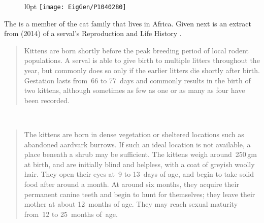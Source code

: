 \begin{figure}l{0pt}
\texttt{[image: EigGen/P1040280]}
\end{figure}
\begin{example} \label{eg:serval} 
The  is a member of the cat family that lives in Africa.
Given next is an extract from  (2014) of a serval's Reproduction and Life History \cite[pp.~142--151]{Sunquist2002}.

\begin{quote}
Kittens are born shortly before the peak breeding period of local rodent populations. A serval is able to give birth to multiple litters throughout the year, but commonly does so only if the earlier litters die shortly after birth. Gestation lasts from~66 to 77~days and commonly results in the birth of two kittens, although sometimes as few as one or as many as four have been recorded.

\end{quote}\ \vspace{-1.5\baselineskip}\begin{quote}%
The kittens are born in dense vegetation or sheltered locations such as abandoned aardvark burrows. If such an ideal location is not available, a place beneath a shrub may be sufficient. The kittens weigh around~250\,gm at birth, and are initially blind and helpless, with a coat of greyish woolly hair. They open their eyes at~9 to 13~days of age, and begin to take solid food after around a month. At around six months, they acquire their permanent canine teeth and begin to hunt for themselves; they leave their mother at about 12~months of age. They may reach sexual maturity from~12 to 25~months of~age.


\end{quote}
\end{example}
